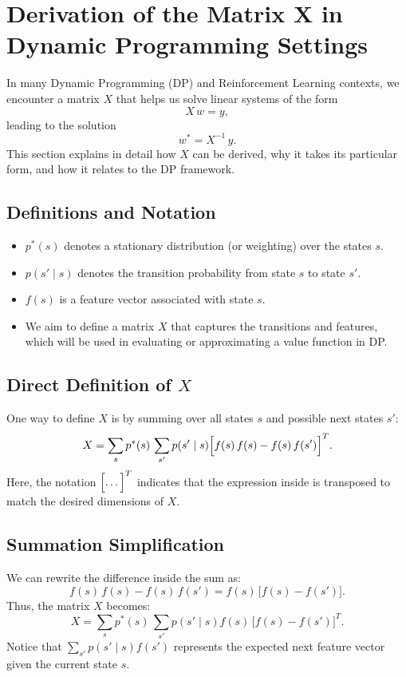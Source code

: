 \section{Derivation of the Matrix X in Dynamic Programming Settings}

In many Dynamic Programming (DP) and Reinforcement Learning contexts, we encounter a matrix $X$ that helps us solve linear systems of the form
\[
X\,w = y,
\]
leading to the solution
\[
w^* = X^{-1}\,y.
\]
This section explains in detail how $X$ can be derived, why it takes its particular form, and how it relates to the DP framework.

\subsection{Definitions and Notation}
\begin{itemize}
    \item $p^*(s)$ denotes a stationary distribution (or weighting) over the states $s$.
    \item $p(s' \mid s)$ denotes the transition probability from state $s$ to state $s'$.
    \item $f(s)$ is a feature vector associated with state $s$. 
    \item We aim to define a matrix $X$ that captures the transitions and features, which will be used in evaluating or approximating a value function in DP.
\end{itemize}

\subsection{Direct Definition of $X$}
One way to define $X$ is by summing over all states $s$ and possible next states $s'$:
\[
X = \sum_{s} p^*(s)\,\sum_{s'} p(s' \mid s)
\Bigl[f(s)\,f(s) - f(s)\,f(s')\Bigr]^T.
\]
Here, the notation $\Bigl[\dots\Bigr]^T$ indicates that the expression inside is transposed to match the desired dimensions of $X$.

\subsection{Summation Simplification}
We can rewrite the difference inside the sum as:
\[
f(s)\,f(s) - f(s)\,f(s') = f(s)\,\bigl[f(s)-f(s')\bigr].
\]
Thus, the matrix $X$ becomes:
\[
X = \sum_{s} p^*(s)\,\sum_{s'} p(s' \mid s)
f(s)\,\bigl[f(s)-f(s')\bigr]^T.
\]
Notice that $\sum_{s'} p(s' \mid s)f(s')$ represents the expected next feature vector given the current state $s$.

